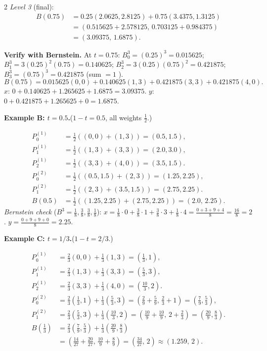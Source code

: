 \begin{paracol}{2}
\emph{Level 3} (final):
\begin{align*}
B(0.75) &= 0.25(2.0625,2.8125)+0.75(3.4375,1.3125)\\
        &= (0.515625+2.578125,\,0.703125+0.984375)\\
        &= \boxed{(3.09375,\,1.6875)}.
\end{align*}

\textbf{Verify with Bernstein.} At $t=0.75$:
$B_0^3=(0.25)^3=0.015625$; $B_1^3=3(0.25)^2(0.75)=0.140625$; $B_2^3=3(0.25)(0.75)^2=0.421875$; $B_3^3=(0.75)^3=0.421875$ (sum $=1$ \checkmark).
\[
B(0.75)=0.015625(0,0)+0.140625(1,3)+0.421875(3,3)+0.421875(4,0).
\]
$x$: $0+0.140625+1.265625+1.6875=3.09375$. $y$: $0+0.421875+1.265625+0=1.6875$. \checkmark

\medskip
\textbf{Example B: $t=0.5$.}\quad ($1{-}t=0.5$, all weights $\tfrac12$.)

\begin{align*}
P_0^{(1)} &= \tfrac12((0,0)+(1,3))=(0.5,1.5),\\
P_1^{(1)} &= \tfrac12((1,3)+(3,3))=(2.0,3.0),\\
P_2^{(1)} &= \tfrac12((3,3)+(4,0))=(3.5,1.5).\\[2pt]
P_0^{(2)} &= \tfrac12((0.5,1.5)+(2,3))=(1.25,2.25),\\
P_1^{(2)} &= \tfrac12((2,3)+(3.5,1.5))=(2.75,2.25).\\[2pt]
B(0.5) &= \tfrac12((1.25,2.25)+(2.75,2.25)) = \boxed{(2.0,\,2.25)}.
\end{align*}
\emph{Bernstein check} ($B^3=\tfrac18,\tfrac38,\tfrac38,\tfrac18$):
$x=\tfrac18\cdot 0+\tfrac38\cdot1+\tfrac38\cdot3+\tfrac18\cdot4=\tfrac{0+3+9+4}{8}=\tfrac{16}{8}=2$.
$y=\tfrac{0+9+9+0}{8}=2.25$. \checkmark

\medskip
\textbf{Example C: $t=1/3$.}\quad ($1{-}t=2/3$.)

\begin{align*}
P_0^{(1)} &= \tfrac{2}{3}(0,0)+\tfrac{1}{3}(1,3)=(\tfrac13,1),\\
P_1^{(1)} &= \tfrac{2}{3}(1,3)+\tfrac{1}{3}(3,3)=(\tfrac{5}{3},3),\\
P_2^{(1)} &= \tfrac{2}{3}(3,3)+\tfrac{1}{3}(4,0)=(\tfrac{10}{3},2).\\[2pt]
P_0^{(2)} &= \tfrac{2}{3}(\tfrac13,1)+\tfrac{1}{3}(\tfrac{5}{3},3)=(\tfrac{2}{9}+\tfrac{5}{9},\,\tfrac{2}{3}+1)=(\tfrac{7}{9},\tfrac{5}{3}),\\
P_1^{(2)} &= \tfrac{2}{3}(\tfrac{5}{3},3)+\tfrac{1}{3}(\tfrac{10}{3},2)=(\tfrac{10}{9}+\tfrac{10}{9},\,2+\tfrac{2}{3})=(\tfrac{20}{9},\tfrac{8}{3}).\\[2pt]
B(\tfrac13) &=\tfrac23(\tfrac{7}{9},\tfrac{5}{3})+\tfrac13(\tfrac{20}{9},\tfrac{8}{3})\\
            &=(\tfrac{14}{27}+\tfrac{20}{27},\,\tfrac{10}{9}+\tfrac{8}{9})=\boxed{(\tfrac{34}{27},\,2)}\approx(1.259,\,2).
\end{align*}


\end{paracol}
